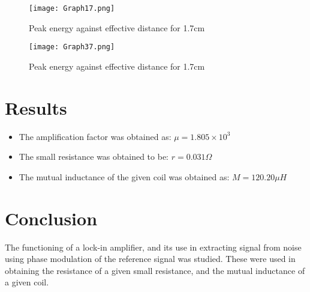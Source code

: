 \documentclass[a4paper]{article}
\begin{document}
\begin{center}
\begin{figure}[H]
\begin{center}
\texttt{[image: Graph17.png]}
\caption{Peak energy against effective distance for 1.7cm}
\end{center}
\end{figure}
\end{center}

\begin{center}
\begin{figure}[H]
\begin{center}
\texttt{[image: Graph37.png]}
\caption{Peak energy against effective distance for 1.7cm}
\end{center}
\end{figure}
\end{center}


\section*{Results}

\begin{itemize}
\item The amplification factor was obtained as: $\mu = 1.805 \times 10^3$
\item The small resistance was obtained to be: $r =0.031\Omega$
\item The mutual inductance of the given coil was obtained as: $M = 120.20 \mu H$
\end{itemize}

\section*{Conclusion}

The functioning of a lock-in amplifier, and its use in extracting signal from noise using phase modulation of the reference signal was studied. These were used in obtaining the resistance of a given small resistance, and the mutual inductance of a given coil.
\end{document}
